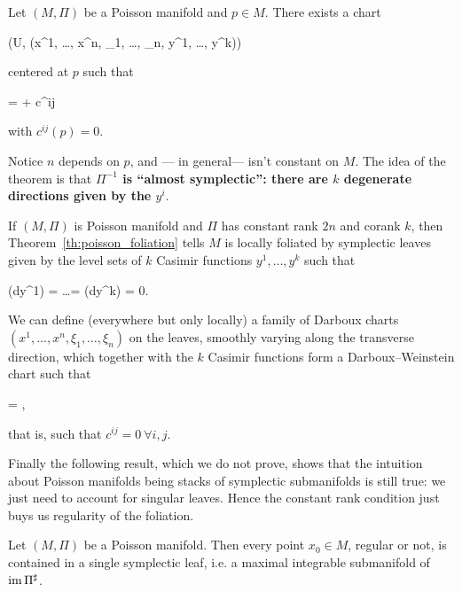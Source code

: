 \begin{theorem}
\label{th:darboux_weinstein}
	Let $(M, \Pi)$ be a Poisson manifold and $p \in M$. There exists a chart
	\begin{eqalign}
		(U, (x^1, \ldots, x^n, \xi_1, \ldots, \xi_n, y^1, \ldots, y^k))
	\end{eqalign}
	centered at $p$ such that
	\begin{eqalign}
		\Pi =  \wedge {} +  c^{ij}  \wedge \pder{}{y^j}
	\end{eqalign}
	with $c^{ij}(p) = 0$.
\end{theorem}

Notice $n$ depends on $p$, and --- in general--- isn't constant on $M$. The idea of the theorem is that \textbf{$\Pi^{-1}$ is ``almost symplectic'': there are $k$ degenerate directions given by the $y^i$}.

\begin{remark}
	If $(M, \Pi)$ is Poisson manifold and $\Pi$ has constant rank $2n$ and corank $k$, then Theorem~\ref{th:poisson_foliation} tells $M$ is locally foliated by symplectic leaves given by the level sets of $k$ Casimir functions $y^1, \ldots, y^k$ such that
	\begin{eqalign}
		\Pi(dy^1) = \ldots = \Pi(dy^k) = 0.
	\end{eqalign}
	We can define (everywhere but only locally) a family of Darboux charts $(x^1, \ldots, x^n, \xi_1, \ldots, \xi_n)$ on the leaves, smoothly varying along the transverse direction, which together with the $k$ Casimir functions form a Darboux--Weinstein chart such that
	\begin{eqalign}
		\Pi =  \wedge \pder{}{\xi_i},
	\end{eqalign}
	that is, such that $c^{ij} = 0\ \forall i,j$.
\end{remark}

Finally the following result, which we do not prove, shows that the intuition about Poisson manifolds being stacks of symplectic submanifolds is still true: we just need to account for singular leaves. Hence the constant rank condition just buys us regularity of the foliation.

\begin{theorem}
	Let $(M, \Pi)$ be a Poisson manifold. Then every point $x_0 \in M$, regular or not, is contained in a single symplectic leaf, i.e. a maximal integrable submanifold of $\operatorname{im} \Pi^\sharp$.
\end{theorem}


